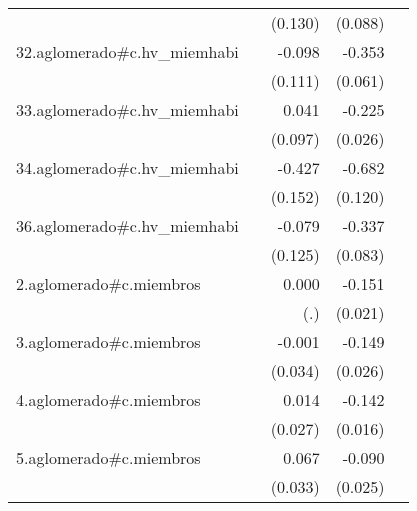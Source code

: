 {\begin{longtable}{l*{4}{D{.}{.}{-1}}}
            &                     &     (0.130)         &     (0.088)         &                     \\
\addlinespace
32.aglomerado#c.hv\_miemhabi&                     &      -0.098         &      -0.353\sym{***}&                     \\
            &                     &     (0.111)         &     (0.061)         &                     \\
\addlinespace
33.aglomerado#c.hv\_miemhabi&                     &       0.041         &      -0.225\sym{***}&                     \\
            &                     &     (0.097)         &     (0.026)         &                     \\
\addlinespace
34.aglomerado#c.hv\_miemhabi&                     &      -0.427\sym{**} &      -0.682\sym{***}&                     \\
            &                     &     (0.152)         &     (0.120)         &                     \\
\addlinespace
36.aglomerado#c.hv\_miemhabi&                     &      -0.079         &      -0.337\sym{***}&                     \\
            &                     &     (0.125)         &     (0.083)         &                     \\
\addlinespace
2.aglomerado#c.miembros&                     &       0.000         &      -0.151\sym{***}&                     \\
            &                     &         (.)         &     (0.021)         &                     \\
\addlinespace
3.aglomerado#c.miembros&                     &      -0.001         &      -0.149\sym{***}&                     \\
            &                     &     (0.034)         &     (0.026)         &                     \\
\addlinespace
4.aglomerado#c.miembros&                     &       0.014         &      -0.142\sym{***}&                     \\
            &                     &     (0.027)         &     (0.016)         &                     \\
\addlinespace
5.aglomerado#c.miembros&                     &       0.067\sym{*}  &      -0.090\sym{***}&                     \\
            &                     &     (0.033)         &     (0.025)         &                     \\

\end{longtable}}
